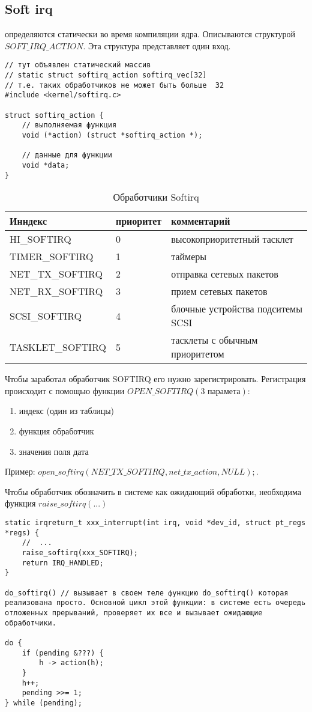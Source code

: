 \subsection{Soft irq}
определяются статически во время компиляции ядра. Описываются структурой $SOFT\_IRQ\_ACTION$. Эта структура представляет один вход.

\begin{lstlisting}
// тут объявлен статический массив 
// static struct softirq_action softirq_vec[32]
// т.е. таких обработчиков не может быть больше  32
#include <kernel/softirq.c>

struct softirq_action {
	// выполняемая функция
	void (*action) (struct *softirq_action *);

	// данные для функции
	void *data; 
}
\end{lstlisting}

\begin{table}[H]
\caption{Обработчики Softirq}
\begin{tabular}{|l|l|l|}
\hline
Инндекс & приоритет &  комментарий\\
\hline
HI\_SOFTIRQ & 0 & высокоприоритетный тасклет \\
TIMER\_SOFTIRQ  & 1 & таймеры\\
NET\_TX\_SOFTIRQ &  2 & отправка сетевых пакетов\\
NET\_RX\_SOFTIRQ &  3 & прием сетевых пакетов\\
SCSI\_SOFTIRQ &  4 & блочные устройства подситемы SCSI\\
TASKLET\_SOFTIRQ & 5 & тасклеты с обычным приоритетом \\
\hline
\end{tabular}
\end{table}

Чтобы заработал обработчик SOFTIRQ его нужно зарегистрировать. Регистрация происходит с помощью функции $OPEN\_SOFTIRQ(\text{3 парамета})$:
\begin{enumerate}
	\item индекс (один из таблицы)
	\item функция обработчик
	\item значения поля дата 
\end{enumerate}

Пример: $open\_softirq(NET\_TX\_SOFTIRQ, net\_tx\_action, NULL);$.

Чтобы обработчик обозначить в системе как ожидающий обработки, необходима функция $raise\_softirq(...)$

\begin{lstlisting}
static irqreturn_t xxx_interrupt(int irq, void *dev_id, struct pt_regs *regs) {
	//  ...
	raise_softirq(xxx_SOFTIRQ);
	return IRQ_HANDLED;
}

do_softirq() // вызывает в своем теле функцию do_softirq() которая реализована просто. Основной цикл этой функции: в системе есть очередь отложенных прерываний, проверяет их все и вызывает ожидающие обработчики.

do {
	if (pending &???) {
		h -> action(h);
	}
	h++;
	pending >>= 1;
} while (pending);
\end{lstlisting}

